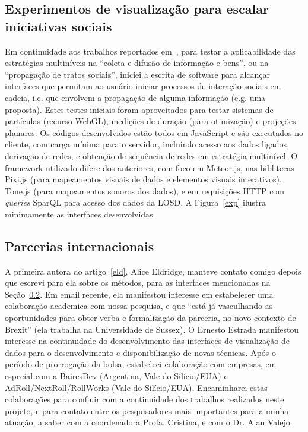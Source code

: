 \documentclass[a4paper, 11pt]{article}
\begin{document}
\subsection{Experimentos de visualização para escalar iniciativas sociais}
Em continuidade aos trabalhos reportados em~\cite{tese,virus,sfvideo},
para testar a aplicabilidade das estratégias multiníveis na ``coleta e difusão de informação e bens'',
ou na ``propagação de tratos sociais'', iniciei a escrita de software para alcançar interfaces
que permitam ao usuário iniciar processos de interação sociais em cadeia, i.e. que envolvem
a propagação de alguma informação (e.g. uma proposta).
Estes testes iniciais foram aproveitados para testar sistemas de partículas (recurso WebGL),
medições de duração (para otimização) e projeções planares.
Os códigos desenvolvidos estão todos em JavaScript e são executados no cliente,
com carga mínima para o servidor,
incluindo acesso aos dados ligados, derivação de redes, e obtenção de sequência de redes
em estratégia multinível.
O framework utilizado difere dos anteriores, com foco em Meteor.js,
nas biblitecas Pixi.js (para mapeamentos visuais de dados e elementos visuais interativos),
Tone.js (para mapeamentos sonoros dos dados),
e em requisições HTTP com \emph{queries} SparQL para acesso dos dados da LOSD.
A Figura~\ref{exp} ilustra minimamente as interfaces desenvolvidas.

\subsection{Parcerias internacionais}
A primeira autora do artigo~\ref{eld}, Alice Eldridge,
manteve contato comigo depois que escrevi para ela sobre
os métodos, para as interfaces mencionadas na Seção~\ref{}.
Em email recente, ela manifestou interesse em
estabelecer uma colaboração academica com nossa pesquisa, e que ``está já
vasculhando as oportunidades para obter verba e formalização da parceria,
no novo contexto de Brexit'' (ela trabalha na Universidade de Sussex).
O Ernesto Estrada manifestou interesse na continuidade do desenvolvimento
das interfaces de visualização de dados para o desenvolvimento e disponibilização
de novas técnicas.
Após o período de prorrogação da bolsa, estabeleci colaboração
com empresas, em especial com a BairesDev (Argentina, Vale do Silício/EUA) e
AdRoll/NextRoll/RollWorks (Vale do Silício/EUA). 
Encaminharei estas colaborações para confluir com a continuidade dos
trabalhos realizados neste projeto, e para contato entre os pesquisadores
mais importantes para a minha atuação, a saber com a coordenadora Profa. Cristina,
e com o Dr. Alan Valejo.
\end{document}
